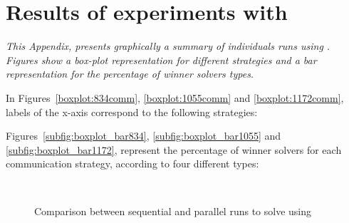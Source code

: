 \chapter{Results of experiments with \grp}
\label{app:grp}
\textit{This Appendix, presents graphically a summary of individuals runs using \grp. Figures show a \textit{box-plot} representation for different strategies and a bar representation for the percentage of winner solvers types.}
\vfill
\newpage

In Figures~\ref{boxplot:834comm}, \ref{boxplot:1055comm} and \ref{boxplot:1172comm}, labels of the x-axis correspond to the following strategies:


Figures~\ref{subfig:boxplot_bar834}, \ref{subfig:boxplot_bar1055} and \ref{subfig:boxplot_bar1172}, represent the percentage of winner solvers for each communication strategy, according to four different types:


\begin{figure}[!h]
\centering
{}\hspace{0.05\linewidth}
\\
\caption[]{Comparison between sequential and parallel runs to solve \GRP{} using \posl}
\label{fig:boxplot_sel_golomb}
\end{figure}

